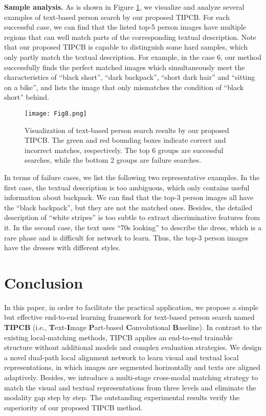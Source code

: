 \documentclass[review]{elsarticle}
\begin{document}
\textbf{Sample analysis.} As is shown in Figure \ref{fig8}, we visualize and analyze several examples of text-based person search by our proposed TIPCB. For each successful case, we can find that the listed top-5 person images have multiple regions that can well match parts of the corresponding textual description. Note that our proposed TIPCB is capable to distinguish some hard samples, which only partly match the textual description. For example, in the case 6, our method successfully finds the perfect matched images which simultaneously meet the characteristics of “black short”, “dark backpack”, “short dark hair” and “sitting on a bike”, and lists the image that only mismatches the condition of “black short” behind.

\begin{figure}[!t]
\centering
\texttt{[image: Fig8.png]}\\
\caption{Visualization of text-based person search results by our proposed TIPCB. The green and red bounding boxes indicate correct and incorrect matches, respectively. The top 6 groups are successful searches, while the bottom 2 groups are failure searches.}
\label{fig8}
\end{figure}

In terms of failure cases, we list the following two representative examples. In the first case, the textual description is too ambiguous, which only contains useful information about backpack. We can find that the top-3 person images all have the “black backpack”, but they are not the matched ones. Besides, the detailed description of “white stripes” is too subtle to extract discriminative features from it. In the second case, the text uses “70s looking” to describe the dress, which is a rare phase and is difficult for network to learn. Thus, the top-3 person images have the dresses with different styles.

\section{Conclusion}
In this paper, in order to facilitate the practical application, we propose a simple but effective end-to-end learning framework for text-based person search named \textbf{TIPCB} (i.e., \textbf{T}ext-\textbf{I}mage \textbf{P}art-based \textbf{C}onvolutional \textbf{B}aseline). In contrast to the existing local-matching methods, TIPCB applies an end-to-end trainable structure without additional models and complex evaluation strategies. We design a novel dual-path local alignment network to learn visual and textual local representations, in which images are segmented horizontally and texts are aligned adaptively. Besides, we introduce a multi-stage cross-modal matching strategy to match the visual and textual representations from three levels and eliminate the modality gap step by step. The outstanding experimental results verify the superiority of our proposed TIPCB method.
\end{document}
